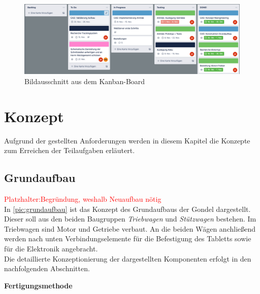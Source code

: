 \begin{figure}[h] %
	\includegraphics[width=17cm]{kanban.png}
	\caption{Bildausschnitt aus dem Kanban-Board}
	\label{pic:kanban}
\end{figure}


\chapter{Konzept}
Aufgrund der gestellten Anforderungen werden in diesem Kapitel die Konzepte zum Erreichen der Teilaufgaben erläutert. \newpage

\section{Grundaufbau}
\textcolor{red}{Platzhalter:Begründung, weshalb Neuaufbau nötig}\\
In  \autoref{pic:grundaufbau} ist das Konzept des Grundaufbaus der Gondel dargestellt. Dieser soll aus den beiden Baugruppen \textit{Triebwagen} und \textit{Stützwagen} bestehen. Im Triebwagen sind Motor und Getriebe verbaut. An die beiden Wägen anchließend werden nach unten Verbindungselemente für die Befestigung des Tabletts sowie für die Elektronik angebracht. \\
Die detaillierte Konzeptionierung der dargestellten Komponenten erfolgt in den nachfolgenden Abschnitten. 

\textbf{Fertigungsmethode} 

